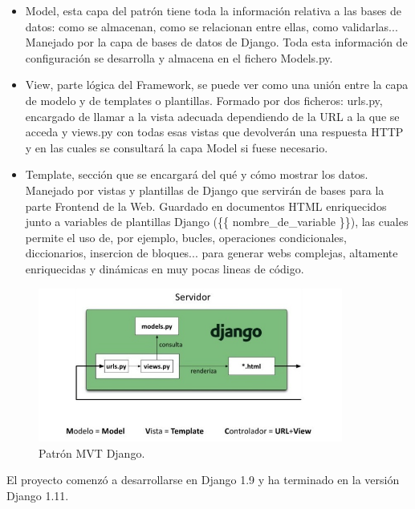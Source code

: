 \documentclass[11pt,a4paper]{book}
\begin{document}
				\begin{itemize}
					\item Model, esta capa del patrón tiene toda la información relativa a las bases de datos: como se almacenan, como se relacionan entre ellas, como validarlas... Manejado por la capa de bases de datos de Django. Toda esta información de configuración se desarrolla y almacena en el fichero Models.py.\\
					
					
					\item View, parte lógica del Framework, se puede ver como una unión entre la capa de modelo y de templates o plantillas. Formado por dos ficheros: urls.py, encargado de llamar a la vista adecuada dependiendo de la URL a la que se acceda y views.py con todas esas vistas que devolverán una respuesta HTTP y en las cuales se consultará la capa Model si fuese necesario.\\
					
					
					\item Template, sección que se encargará del qué y cómo mostrar los datos. Manejado por vistas y plantillas de Django que servirán de bases para la parte Frontend de la Web. Guardado en documentos HTML enriquecidos junto a variables de plantillas Django (\{\{ nombre\_de\_variable \}\}), las cuales permite el uso de, por ejemplo, bucles, operaciones condicionales, diccionarios, insercion de bloques... para generar webs complejas, altamente enriquecidas y dinámicas en muy pocas lineas de código.
					
				\end{itemize}
			
				\begin{figure}
				 	\centering
				 	\includegraphics[width=10cm, keepaspectratio]{img/django_MTV.png}
				 	\caption{Patrón MVT Django.}
				 	\label{fig:MTV_Django}
				 \end{figure}
			 
				El proyecto comenzó a desarrollarse en Django 1.9 y ha terminado en la versión Django 1.11.
				
\end{document}
